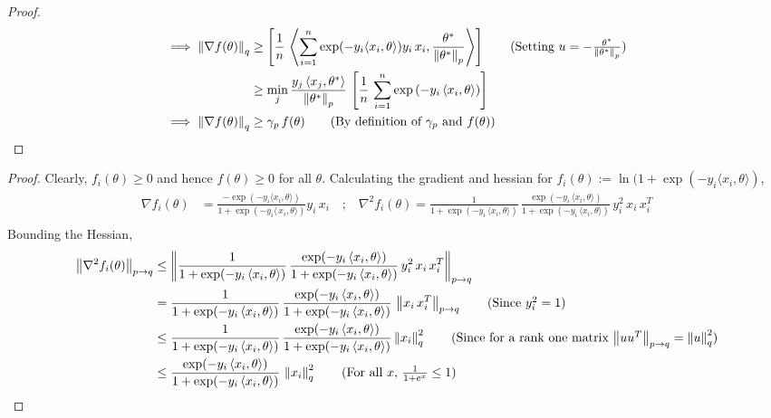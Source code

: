 \documentclass{article}
\newcommand{\normsq}[1]{\left\|#1 \right\|^{2}}
\newcommand{\norm}[1]{\left\|#1 \right\|}
\begin{document}
\begin{proof}
\begin{align*}
\implies \norm{\nabla f(\theta)}_q & \geq \left[ \frac{1}{n} \, \left\langle \sum_{i = 1}^{n} \exp(-y_i \langle x_i, \theta \rangle) y_i \, x_i, \frac{\theta^*}{\norm{\theta^*}_p} \right \rangle \right] \tag{Setting $u = -\frac{\theta^*}{\norm{\theta^*}_p}$} \\
& \geq \min_{j} \frac{y_j \, \langle x_j, \theta^* \rangle}{\norm{\theta^*}_p} \, \left[ \frac{1}{n} \, \sum_{i = 1}^{n} \exp\left(-y_i \, \langle x_i, \theta \rangle \right) \right] \\
\implies \norm{\nabla f(\theta)}_q & \geq \gamma_p \, f(\theta) \tag{By definition of $\gamma_p$ and $f(\theta)$}
\end{align*}
\end{proof}

\logistic*
\begin{proof}
Clearly, $f_i(\theta) \geq 0$ and hence $f(\theta) \geq 0$ for all $\theta$. Calculating the gradient and hessian for $f_i(\theta) := \ln(1 + \exp(-y_i \langle x_i, \theta \rangle)$,
\begin{align*}
\nabla f_i(\theta) & = \frac{-\exp(-y_i \langle x_i, \theta \rangle)}{1 + \exp(-y_i \langle\, x_i, \theta \rangle)} y_i \, x_i \quad \text{;} \quad \nabla^2 f_i(\theta) = \frac{1}{1 + \exp(-y_i \, \langle x_i, \theta \rangle)} \, \frac{\exp(-y_i \, \langle x_i, \theta \rangle)}{1 + \exp(-y_i \, \langle x_i, \theta \rangle)} \, y_i^2 \, x_i \, x_i^T \\
\end{align*}
Bounding the Hessian,
\begin{align*}
\norm{\nabla^2 f_i(\theta)}_{p \to q} & \leq \norm{\frac{1}{1 + \exp(-y_i \, \langle x_i, \theta \rangle)} \, \frac{\exp(-y_i \, \langle x_i, \theta \rangle)}{1 + \exp(-y_i \, \langle x_i, \theta \rangle)} \, y_i^2 \, x_i \, x_i^T}_{p \to q} \\
& = \frac{1}{1 + \exp(-y_i \, \langle x_i, \theta \rangle)} \, \frac{\exp(-y_i \, \langle x_i, \theta \rangle)}{1 + \exp(-y_i \, \langle x_i, \theta \rangle)} \, \norm{x_i \, x_i^T}_{p \to q} \tag{Since $y_i^2 = 1$} \\
& \leq \frac{1}{1 + \exp(-y_i \, \langle x_i, \theta \rangle)} \, \frac{\exp(-y_i \, \langle x_i, \theta \rangle)}{1 + \exp(-y_i \, \langle x_i, \theta \rangle)} \normsq{x_i}_{q} \tag{Since for a rank one matrix $\norm{u u^T}_{p \to q} = \normsq{u}_q$} \\
& \leq \frac{\exp(-y_i \, \langle x_i, \theta \rangle)}{1 + \exp(-y_i \, \langle x_i, \theta \rangle)} \,   \normsq{x_i}_{q} \tag{For all $x$, $\frac{1}{1 + e^x} \leq 1$} \\

\end{align*}
\end{proof}
\end{document}
